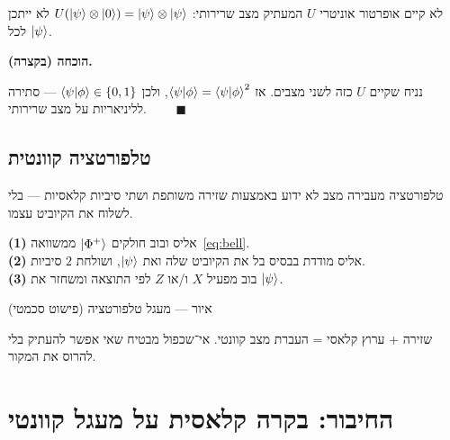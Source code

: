 \begin{thmbox}[frametitle={משפט — אי־שכפול}]
לא קיים אופרטור אוניטרי $U$ המעתיק מצב שרירותי:
$U(\left|\psi\right\rangle\otimes\left|0\right\rangle)=\left|\psi\right\rangle\otimes\left|\psi\right\rangle$ לא ייתכן לכל $\left|\psi\right\rangle$.
\end{thmbox}

\noindent\textbf{הוכחה (בקצרה).}

נניח שקיים $U$ כזה לשני מצבים. אז $\left\langle\psi\middle|\phi\right\rangle=\left\langle\psi\middle|\phi\right\rangle^2$,
ולכן $\left\langle\psi\middle|\phi\right\rangle\in\{0,1\}$ — סתירה לליניאריות על מצב שרירותי. $\qquad\blacksquare$

\chapter{טלפורטציה קוונטית}
\label{ch:teleport}

טלפורטציה מעבירה מצב לא ידוע באמצעות שזירה משותפת ושתי סיביות קלאסיות —
בלי לשלוח את הקיוביט עצמו.

\begin{keybox}[frametitle={פרוטוקול הטלפורטציה}]
\textbf{(1)} אליס ובוב חולקים $\left|\Phi^+\right\rangle$ ממשוואה~\eqref{eq:bell}.\\
\textbf{(2)} אליס מודדת בבסיס בל את הקיוביט שלה ואת $\left|\psi\right\rangle$, ושולחת $2$ סיביות.\\
\textbf{(3)} בוב מפעיל $X$ ו/או $Z$ לפי התוצאה ומשחזר את $\left|\psi\right\rangle$.
\end{keybox}

\begin{qcirc}
\end{qcirc}
\begin{center}\small איור — מעגל טלפורטציה (פישוט סכמטי)\end{center}

\begin{keybox}[frametitle={לקח}]
שזירה + ערוץ קלאסי = העברת מצב קוונטי.
אי־שכפול מבטיח שאי אפשר להעתיק בלי להרוס את המקור.
\end{keybox}

\part{החיבור: בקרה קלאסית על מעגל קוונטי}

